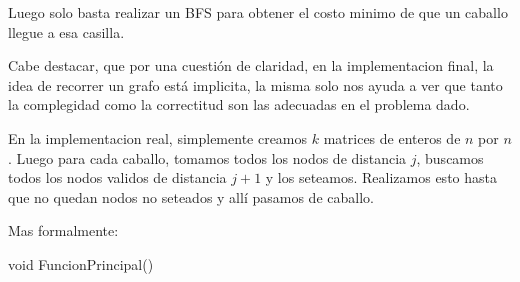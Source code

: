 Luego solo basta realizar un BFS para obtener el costo minimo de que un caballo llegue a esa casilla.

Cabe destacar, que por una cuesti\'on de claridad, en la implementacion final, la idea de recorrer un grafo est\'a implicita, la misma solo nos ayuda a ver que tanto la complegidad como la correctitud son las adecuadas en el problema dado.

En la implementacion real, simplemente creamos $k$ matrices de enteros de $n$ por $n$. Luego para cada caballo, tomamos todos los nodos de distancia $j$, buscamos todos los nodos validos de distancia $j+1$ y los seteamos. Realizamos esto hasta que no quedan nodos no seteados y all\'i pasamos de caballo.

Mas formalmente:

\begin{algorithm}
\begin{algorithmic}[1]\parskip=1mm
\caption{void FuncionPrincipal()}


  
  




  





 
 \end{algorithmic}
\end{algorithm}

